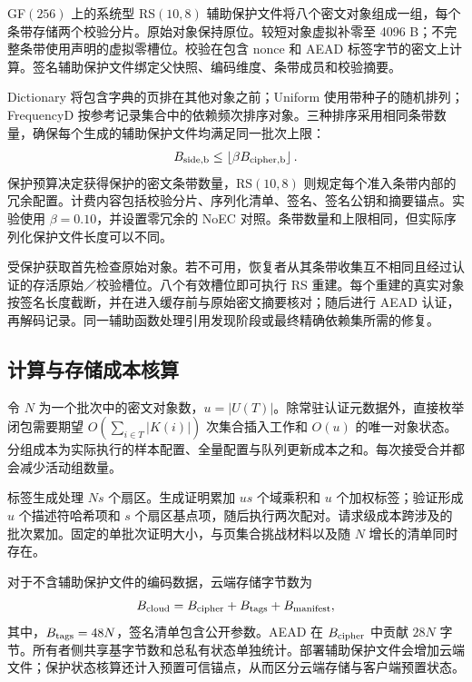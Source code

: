 \documentclass[10pt,journal]{IEEEtran}
\begin{document}
GF$(256)$ 上的系统型 RS$(10,8)$ 辅助保护文件将八个密文对象组成一组，每个条带存储两个校验分片。原始对象保持原位。较短对象虚拟补零至 4096 B；不完整条带使用声明的虚拟零槽位。校验在包含 nonce 和 AEAD 标签字节的密文上计算。签名辅助保护文件绑定父快照、编码维度、条带成员和校验摘要。

Dictionary 将包含字典的页排在其他对象之前；Uniform 使用带种子的随机排列；FrequencyD 按参考记录集合中的依赖频次排序对象。三种排序采用相同条带数量，确保每个生成的辅助保护文件均满足同一批次上限：
\begin{equation}\label{eq:budget}
B_{\rm side,b}\leq\left\lfloor\beta B_{\rm cipher,b}\right\rfloor.
\end{equation}
保护预算决定获得保护的密文条带数量，RS$(10,8)$ 则规定每个准入条带内部的冗余配置。计费内容包括校验分片、序列化清单、签名、签名公钥和摘要锚点。实验使用 $\beta=0.10$，并设置零冗余的 NoEC 对照。条带数量和上限相同，但实际序列化保护文件长度可以不同。

受保护获取首先检查原始对象。若不可用，恢复者从其条带收集互不相同且经过认证的存活原始／校验槽位。八个有效槽位即可执行 RS 重建。每个重建的真实对象按签名长度截断，并在进入缓存前与原始密文摘要核对；随后进行 AEAD 认证，再解码记录。同一辅助函数处理引用发现阶段或最终精确依赖集所需的修复。

\subsection{计算与存储成本核算}\label{sec:accounting}
令 $N$ 为一个批次中的密文对象数，$u=|U(T)|$。除常驻认证元数据外，直接枚举闭包需要期望 $O(\sum_{i\in T}|K(i)|)$ 次集合插入工作和 $O(u)$ 的唯一对象状态。分组成本为实际执行的样本配置、全量配置与队列更新成本之和。每次接受合并都会减少活动组数量。

标签生成处理 $Ns$ 个扇区。生成证明累加 $us$ 个域乘积和 $u$ 个加权标签；验证形成 $u$ 个描述符哈希项和 $s$ 个扇区基点项，随后执行两次配对。请求级成本跨涉及的批次累加。固定的单批次证明大小，与页集合挑战材料以及随 $N$ 增长的清单同时存在。

对于不含辅助保护文件的编码数据，云端存储字节数为
\begin{equation}\label{eq:cloud-cost}
B_{\rm cloud}=B_{\rm cipher}+B_{\rm tags}+B_{\rm manifest},
\end{equation}
其中，$B_{\rm tags}=48N$，签名清单包含公开参数。AEAD 在 $B_{\rm cipher}$ 中贡献 $28N$ 字节。所有者侧共享基字节数和总私有状态单独统计。部署辅助保护文件会增加云端文件；保护状态核算还计入预置可信锚点，从而区分云端存储与客户端预置状态。
\end{document}
